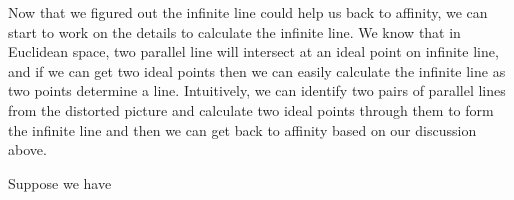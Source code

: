 \documentclass[conference]{IEEEtran}
\begin{document}
Now that we figured out the infinite line could help us back to affinity, we can start to work on the details to calculate the infinite line. We know that in Euclidean space, two parallel line will intersect at an ideal point on infinite line, and if we can get two ideal points then we can easily calculate the infinite line as two points determine a line. Intuitively, we can identify two pairs of parallel lines from the distorted picture and calculate two ideal points through them to form the infinite line and then we can get back to affinity based on our discussion above.

Suppose we have 









%
%
%






\end{document}
